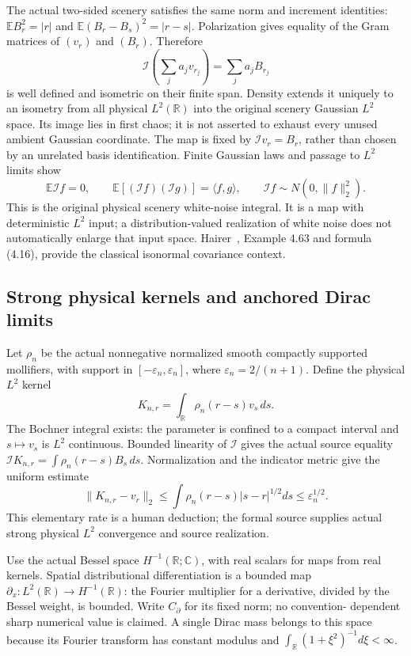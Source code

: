 \documentclass[11pt]{article}
\newcommand{\R}{\mathbb R}\newcommand{\E}{\mathbb E}
\begin{document}
The actual two-sided scenery satisfies the same norm and increment
identities: $\E B_r^2=|r|$ and $\E(B_r-B_s)^2=|r-s|$.
Polarization gives equality of the Gram matrices of $(v_r)$ and
$(B_r)$. Therefore
\[
 \mathcal I\left(\sum_j a_jv_{r_j}\right)=\sum_j a_jB_{r_j}
\]
is well defined and isometric on their finite span. Density extends
it uniquely to an isometry from all physical $L^2(\R)$ into the
original scenery Gaussian $L^2$ space. Its image lies in first
chaos; it is not asserted to exhaust every unused ambient Gaussian
coordinate. The map is fixed by $\mathcal I v_r=B_r$, rather than
chosen by an unrelated basis identification. Finite Gaussian laws
and passage to $L^2$ limits show
\[
 \E\mathcal If=0,\qquad
 \E[(\mathcal If)(\mathcal Ig)]=\langle f,g\rangle,
 \qquad \mathcal If\sim N(0,\|f\|_2^2).
\]
This is the original physical scenery white-noise integral. It is a
map with deterministic $L^2$ input; a distribution-valued
realization of white noise does not automatically enlarge that
input space. Hairer~\cite{hairer}, Example 4.63 and formula (4.16),
provide the classical isonormal covariance context.

\subsection*{Strong physical kernels and anchored Dirac limits}
Let $\rho_n$ be the actual nonnegative normalized smooth compactly
supported mollifiers, with support in
$[-\varepsilon_n,\varepsilon_n]$, where
$\varepsilon_n=2/(n+1)$. Define the physical $L^2$ kernel
\[
 K_{n,r}=\int_\R\rho_n(r-s)v_s\,ds.
\]
The Bochner integral exists: the parameter is confined to a compact
interval and $s\mapsto v_s$ is $L^2$ continuous. Bounded linearity
of $\mathcal I$ gives the actual source equality
$\mathcal IK_{n,r}=\int\rho_n(r-s)B_s\,ds$.
Normalization and the indicator metric give the uniform estimate
\begin{equation}\label{eq:physicalkernelrate}
 \|K_{n,r}-v_r\|_2
 \le\int\rho_n(r-s)|s-r|^{1/2}ds
 \le\varepsilon_n^{1/2}.
\end{equation}
This elementary rate is a human deduction; the formal source
supplies actual strong physical $L^2$ convergence and source
realization.

Use the actual Bessel space $H^{-1}(\R;\mathbb C)$, with real scalars for
maps from real kernels. Spatial distributional differentiation is
a bounded map $\partial_x:L^2(\R)\to H^{-1}(\R)$: the Fourier
multiplier for a derivative, divided by the Bessel weight, is
bounded. Write $C_\partial$ for its fixed norm; no convention-
dependent sharp numerical value is claimed. A single Dirac mass
belongs to this space because its Fourier transform has constant
modulus and $\int_\R(1+\xi^2)^{-1}d\xi<\infty$.
\end{document}
